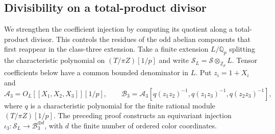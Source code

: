\subsection{Divisibility on a total-product divisor}
\label{subsec:degree-three-saturation}

We strengthen the coefficient injection by computing
its quotient along a total-product divisor. This controls
the residues of the odd abelian components that first
reappear in the class-three extension.
Take a finite extension $L/\mathbb Q_p$ splitting the
characteristic polynomial on $(T/\pi Z)[1/p]$ and write
$\mathcal S_L=\mathcal S\otimes_{\mathbb Z_p}L$.
Tensor coefficients below have a common bounded
denominator in $L$. Put $z_i=1+X_i$ and
\[
 \mathcal A_3=O_L[[X_1,X_2,X_3]][1/p],\qquad
 \mathcal B_3=\mathcal A_3
       [q(z_1z_2)^{-1},q(z_1z_3)^{-1},q(z_2z_3)^{-1}],
\]
where $q$ is a characteristic polynomial for the finite
rational module $(T/\pi Z)[1/p]$.
The preceding proof constructs an equivariant injection
$\iota_3:\mathcal S_L\to\mathcal B_3^{\oplus d}$,
with $d$ the finite number of ordered color coordinates.


